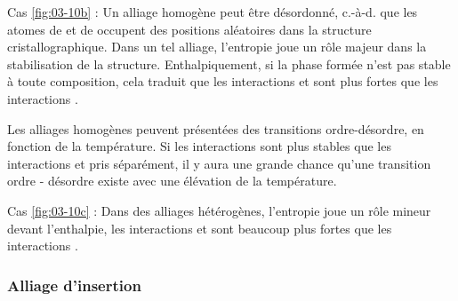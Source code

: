 \documentclass[a4paper,16pt]{book}
\begin{document}
Cas \ref{fig:03-10b} : Un alliage homogène peut être désordonné, c.-à-d. que les atomes de  et de  occupent des positions aléatoires dans la structure cristallographique. Dans un tel alliage, l'entropie joue un rôle majeur dans la stabilisation de la structure. Enthalpiquement, si la phase formée n'est pas stable à toute composition, cela traduit que les interactions  et  sont plus fortes que les interactions . 

Les alliages homogènes peuvent présentées des transitions ordre-désordre, en fonction de la température. Si les interactions  sont plus stables que les interactions  et  pris séparément, il y aura une grande chance qu'une transition ordre - désordre existe avec une élévation de la température.

Cas \ref{fig:03-10c} : Dans des alliages hétérogènes, l'entropie joue un rôle mineur devant l'enthalpie, les interactions  et  sont beaucoup plus fortes que les interactions . 




\subsubsection{Alliage d'insertion}
\end{document}
